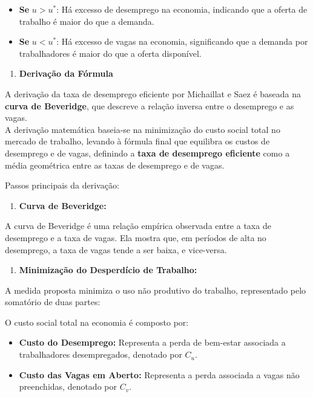 \documentclass[
]{article}
\providecommand{\tightlist}{%
  \setlength{\itemsep}{0pt}\setlength{\parskip}{0pt}}
\begin{document}
\begin{itemize}
\tightlist
\item
  \textbf{Se} \(u > u^*\): Há excesso de desemprego na economia,
  indicando que a oferta de trabalho é maior do que a demanda.
\item
  \textbf{Se} \(u < u^*\): Há excesso de vagas na economia, significando
  que a demanda por trabalhadores é maior do que a oferta disponível.
\end{itemize}

\begin{enumerate}
\def\labelenumi{\arabic{enumi}.}
\setcounter{enumi}{2}
\tightlist
\item
  \textbf{Derivação da Fórmula}
\end{enumerate}

A derivação da taxa de desemprego eficiente por Michaillat e Saez é
baseada na \textbf{curva de Beveridge}, que descreve a relação inversa
entre o desemprego e as vagas.\\
A derivação matemática baseia-se na minimização do custo social total no
mercado de trabalho, levando à fórmula final que equilibra os custos de
desemprego e de vagas, definindo a \textbf{taxa de desemprego eficiente}
como a média geométrica entre as taxas de desemprego e de vagas.

Passos principais da derivação:

\begin{enumerate}
\def\labelenumi{\alph{enumi}.}
\tightlist
\item
  \textbf{Curva de Beveridge:}
\end{enumerate}

A curva de Beveridge é uma relação empírica observada entre a taxa de
desemprego e a taxa de vagas. Ela mostra que, em períodos de alta no
desemprego, a taxa de vagas tende a ser baixa, e vice-versa.

\begin{enumerate}
\def\labelenumi{\alph{enumi}.}
\setcounter{enumi}{1}
\tightlist
\item
  \textbf{Minimização do Desperdício de Trabalho:}
\end{enumerate}

A medida proposta minimiza o uso não produtivo do trabalho, representado
pelo somatório de duas partes:

O custo social total na economia é composto por:

\begin{itemize}
\tightlist
\item
  \textbf{Custo do Desemprego:} Representa a perda de bem-estar
  associada a trabalhadores desempregados, denotado por \(C_u\).
\item
  \textbf{Custo das Vagas em Aberto:} Representa a perda associada a
  vagas não preenchidas, denotado por \(C_v\).
\end{itemize}
\end{document}

